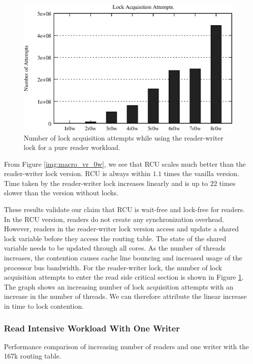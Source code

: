 \documentclass[a4paper]{article}
\begin{document}
\begin{figure}[tph]
\centering
\includegraphics[scale = 0.7]{../images/graphs/profile_lockcount_macro_rwl_vr_0w}
\caption{Number of lock acquisition attempts while using the reader-writer lock for a pure reader workload.}
\label{img:profile_rwl_locks_vr_0w}
\end{figure}

From Figure \ref{img:macro_vr_0w}, we see that RCU scales much better
than the reader-writer lock version. RCU is always within $1.1$ times
the vanilla version. Time taken by the reader-writer lock increases
linearly and is up to $22$ times slower than the version without
locks.

These results validate our claim that RCU is wait-free and lock-free
for readers. In the RCU version, readers do not create any
synchronization overhead. However, readers in the reader-writer lock version
access and update a shared lock variable before they access the routing
table. The state of the shared variable needs to be updated through
all cores. As the number of threads increases, the contention causes
cache line bouncing and increased usage of the processor bus
bandwidth. For the reader-writer lock, the number of lock acquisition attempts to enter
the read side critical section is shown in Figure \ref{img:profile_rwl_locks_vr_0w}. The graph shows an increasing number of lock acquisition attempts with an increase in the number of threads. We can therefore attribute the  linear increase in time to lock contention. 

\subsubsection{Read Intensive Workload With One Writer}
\begin{table}[tph]
\begin{center}

\end{center}
\caption{Performance comparison of increasing number of readers and one writer with the 167k routing table.}
\label{tbl:macro_vr_1w}
\end{table}
\end{document}
